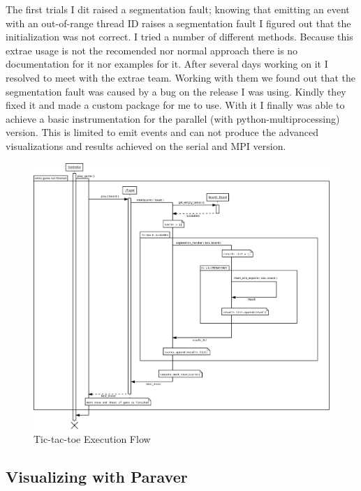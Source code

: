 The first trials I dit raised a segmentation fault; knowing that emitting an event with an out-of-range thread ID raises a segmentation fault I figured out that the initialization was not correct. I tried a number of different methods. Because this extrae usage is not the recomended nor normal approach there is no documentation for it nor examples for it. After several days working on it I resolved to meet with the extrae team. Working with them we found out that the segmentation fault was caused by a bug on the release I was using. Kindly they fixed it and made a custom package for me to use. With it I finally was able to achieve a basic instrumentation for the parallel (with python-multiprocessing) version. This is limited to emit events and can not produce the advanced visualizations and results achieved on the serial and MPI version.

\begin{landscape}
\begin{figure}
\includegraphics[width=20cm]{img/tic-tac-toe.png}
\caption{Tic-tac-toe Execution Flow}
\label{fig:tic-tac-toe}
\end{figure}
\end{landscape}


\subsection{Visualizing with Paraver}


